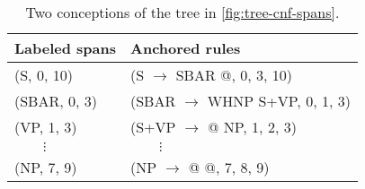 \begin{table}[]
  \small
  \bgroup  %
  \def\arraystretch{1.5}  %
  \begin{tabular}{l|l}
    Labeled spans & Anchored rules \\
    \hline
    (S, 0, 10)     & (S $\to$ SBAR @, 0, 3, 10)  \\
    (SBAR, 0, 3)   & (SBAR $\to$ WHNP S+VP, 0, 1, 3)  \\
    (VP, 1, 3)     & (S+VP $\to$ @ NP, 1, 2, 3)  \\
    $\qquad\vdots$ & $\qquad\vdots$  \\
    (NP, 7, 9)     & (NP $\to$ @ @, 7, 8, 9)  \\
  \end{tabular}
  \caption{Two conceptions of the tree in \ref{fig:tree-cnf-spans}.}
  \label{tab:spans-rules}
  \egroup  %
\end{table}

